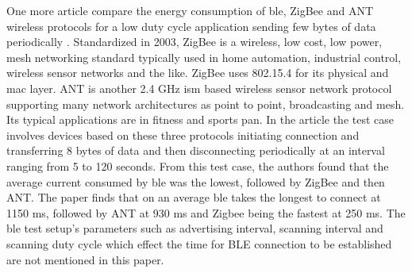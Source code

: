 One more article compare the energy consumption of \gls{ble}, ZigBee and ANT wireless protocols for a low duty cycle application sending few bytes of data periodically   \cite{Dementyev2013}. Standardized in 2003, ZigBee is a wireless, low cost, low power, mesh networking standard  \cite{ZigbeeAkl} typically used in home automation, industrial control, wireless sensor networks and the like. ZigBee uses 802.15.4 for its physical and \gls{mac} layer. ANT is another 2.4 GHz \gls{ism} based wireless sensor network protocol supporting many network architectures as point to point, broadcasting and mesh. Its typical applications are in fitness and sports \gls{pan}. In the article  \cite{Dementyev2013} the test case involves devices based on these three protocols initiating connection and transferring 8 bytes of data and then disconnecting periodically at an interval ranging from 5 to 120 seconds. From this test case, the authors found that the average current consumed by \gls{ble} was the lowest, followed by ZigBee and then ANT. The paper finds that on an average \gls{ble} takes the longest to connect at 1150 ms, followed by ANT at 930 ms and Zigbee being the fastest at 250 ms. The \gls{ble} test setup's parameters such as advertising interval, scanning interval and scanning duty cycle which effect the time for BLE connection to be established are not mentioned in this paper.

